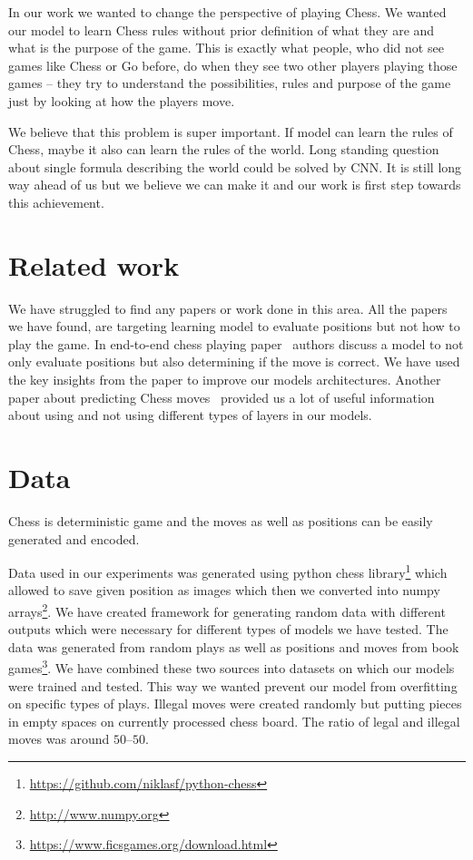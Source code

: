 \documentclass[10pt,twocolumn,letterpaper]{article}
\begin{document}
In our work we wanted to change the perspective of playing Chess. We wanted our
model to learn Chess rules without prior definition of what they are and what is
the purpose of the game. This is exactly what people, who did not see games like
Chess or Go before, do when they see two other players playing those games --
they try to understand the possibilities, rules and purpose of the game just by
looking at how the players move.

We believe that this problem is super important. If model can learn the rules of
Chess, maybe it also can learn the rules of the world. Long standing question
about single formula describing the world could be solved by CNN. It is still
long way ahead of us but we believe we can make it and our work is first step
towards this achievement.

\section{Related work}

We have struggled to find any papers or work done in this area. All the papers
we have found, are targeting learning model to evaluate positions but not how to
play the game. In end-to-end chess playing paper~\cite{DeepChess} authors
discuss a model to not only evaluate positions but also determining if the move
is correct. We have used the key insights from the paper to improve our models
architectures. Another paper about predicting Chess
moves~\cite{Oshri2015PredictingMI} provided us a lot of useful information about
using and not using different types of layers in our models.

\section{Data}

Chess is deterministic game and the moves as well as positions can be easily
generated and encoded.

Data used in our experiments was generated using python chess
library\footnote{\url{https://github.com/niklasf/python-chess}} which allowed to save
given position as images which then we converted into numpy
arrays\footnote{\url{http://www.numpy.org}}. We have created framework for generating
random data with different outputs which were necessary for different types of
models we have tested. The data was generated from random plays as well as
positions and moves from book
games\footnote{\url{https://www.ficsgames.org/download.html}}. We have combined these
two sources into datasets on which our models were trained and tested. This way
we wanted prevent our model from overfitting on specific types of plays. Illegal
moves were created randomly but putting pieces in empty spaces on currently
processed chess board. The ratio of legal and illegal moves was around
$50$--$50$.
\end{document}
